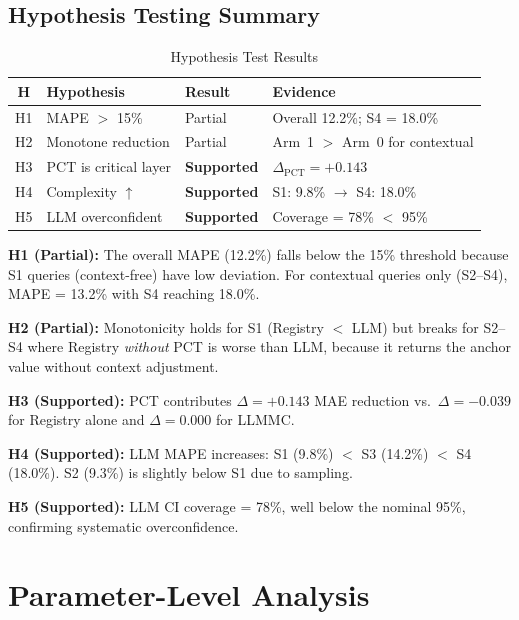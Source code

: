 \subsection{Hypothesis Testing Summary}

\begin{table}[htbp]
\centering
\caption{Hypothesis Test Results}
\label{tab:tla-hypotheses}
\begin{tabular}{clll}
\toprule
\textbf{H} & \textbf{Hypothesis} & \textbf{Result} & \textbf{Evidence} \\
\midrule
H1 & MAPE $>$ 15\%          & Partial  & Overall 12.2\%; S4 = 18.0\% \\
H2 & Monotone reduction     & Partial  & Arm~1 $>$ Arm~0 for contextual \\
H3 & PCT is critical layer  & \textbf{Supported}  & $\Delta_{\text{PCT}} = +0.143$ \\
H4 & Complexity $\uparrow$  & \textbf{Supported}  & S1: 9.8\% $\to$ S4: 18.0\% \\
H5 & LLM overconfident      & \textbf{Supported}  & Coverage = 78\% $<$ 95\% \\
\bottomrule
\end{tabular}
\end{table}

\textbf{H1 (Partial):} The overall MAPE (12.2\%) falls below the 15\%
threshold because S1 queries (context-free) have low deviation. For
contextual queries only (S2--S4), MAPE = 13.2\% with S4 reaching 18.0\%.

\textbf{H2 (Partial):} Monotonicity holds for S1 (Registry $<$ LLM) but
breaks for S2--S4 where Registry \emph{without} PCT is worse than LLM,
because it returns the anchor value without context adjustment.

\textbf{H3 (Supported):} PCT contributes $\Delta = +0.143$ MAE reduction
vs.\ $\Delta = -0.039$ for Registry alone and $\Delta = 0.000$ for LLMMC.

\textbf{H4 (Supported):} LLM MAPE increases: S1 (9.8\%) $<$ S3 (14.2\%)
$<$ S4 (18.0\%). S2 (9.3\%) is slightly below S1 due to sampling.

\textbf{H5 (Supported):} LLM CI coverage = 78\%, well below the nominal
95\%, confirming systematic overconfidence.



\section{Parameter-Level Analysis}
\label{sec:lb-parameters}

